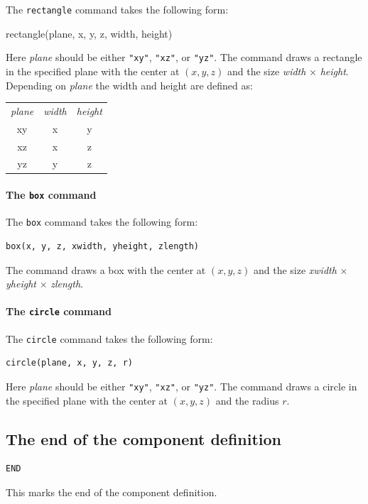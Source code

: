 The {\tt rectangle} command takes the following form:
\begin{mcstas}
rectangle(plane, x, y, z, width, height)
\end{mcstas}
Here {\it plane} should be either \verb+"xy"+, \verb+"xz"+, or
\verb+"yz"+. The command draws a rectangle in the specified plane with
the center at $(x, y, z)$ and the size {\it width} $\times$ {\it
height}. Depending on {\it plane} the width and height are defined as:\\
\begin{tabular} {ccc}
  {\it plane} & {\it width} & {\it height} \\
  xy & x & y \\
  xz & x & z \\
  yz & y & z \\
 \end{tabular}

\paragraph{The {\tt box} command}

The {\tt box} command takes the following form:
\begin{lstlisting}
box(x, y, z, xwidth, yheight, zlength)
\end{lstlisting}
The command draws a box with the center at $(x, y, z)$ and the size {\it xwidth} $\times$ {\it yheight} $\times$ {\it zlength}.

\paragraph{The {\tt circle} command}

The {\tt circle} command takes the following form:
\begin{lstlisting}
circle(plane, x, y, z, r)
\end{lstlisting}
Here {\it plane} should be either \verb+"xy"+, \verb+"xz"+, or
\verb+"yz"+. The command draws a circle in the specified plane with the center
 at $(x, y, z)$ and the radius $r$.



\subsection{The end of the component definition}

\begin{lstlisting}
END
\end{lstlisting}
This marks the end of the component definition.


